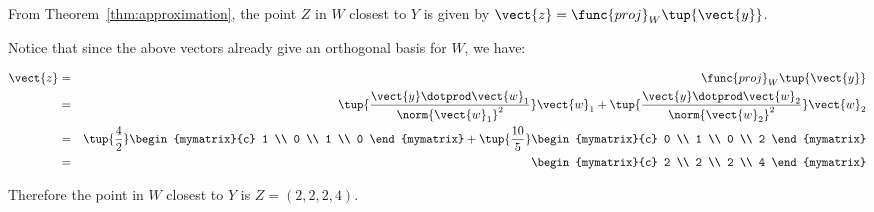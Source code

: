 \begin{solution}
From Theorem~\ref{thm:approximation}, the point $Z$ in $W$ closest to
$Y$ is given by $\vect{z} = \func{proj}_{W}\tup{\vect{y}}$.

Notice that since the above vectors already give an orthogonal basis for $W$, we have:

\begin{eqnarray*}
\vect{z} &=& \func{proj}_{W}\tup{\vect{y}}\\
&=&
\tup{\frac{\vect{y} \dotprod \vect{w}_1}{ \norm{\vect{w}_1}^2}} \vect{w}_1
+
\tup{\frac{\vect{y} \dotprod \vect{w}_2}{ \norm{\vect{w}_2}^2}} \vect{w}_2 \\
&=& 
\tup{\frac{4}{2} } \begin{mymatrix}{c}
1 \\
0 \\
1 \\
0 
\end{mymatrix}
+
\tup{\frac{10}{5} }
\begin{mymatrix}{c}
0 \\
1 \\
0 \\
2
\end{mymatrix} \\
&=& 
\begin{mymatrix}{c}
2 \\
2 \\
2 \\
4 
\end{mymatrix}
\end{eqnarray*} 

Therefore the point in $W$ closest to $Y$ is $Z = (2,2,2,4)$. \\


\end{solution}

